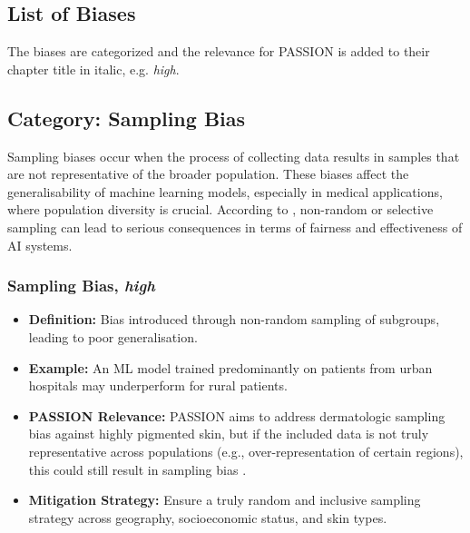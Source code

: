 	\begin{refsection}
		\chapter{List of Biases}\label{app:listOfBiases}
		The biases are categorized and the relevance for PASSION is added to their chapter title in italic, e.g. \textit{high}.
		
		\section{\textbf{Category:} Sampling Bias}
		Sampling biases occur when the process of collecting data results in samples that are not representative of the broader population. These biases affect the generalisability of machine learning models, especially in medical applications, where population diversity is crucial. According to \textcite{Mehrabi_2021}, non-random or selective sampling can lead to serious consequences in terms of fairness and effectiveness of AI systems.
		
		\subsection{Sampling Bias, \textit{high}}
		\begin{itemize}
			\item \textbf{Definition:} Bias introduced through non-random sampling of subgroups, leading to poor generalisation.
			\item \textbf{Example:} An ML model trained predominantly on patients from urban hospitals may underperform for rural patients.
			\item \textbf{PASSION Relevance:} PASSION aims to address dermatologic sampling bias against highly pigmented skin, but if the included data is not truly representative across populations (e.g., over-representation of certain regions), this could still result in sampling bias \autocite{Mehrabi_2021}.
			\item \textbf{Mitigation Strategy:} Ensure a truly random and inclusive sampling strategy across geography, socioeconomic status, and skin types.
		\end{itemize}
		

\end{refsection}
